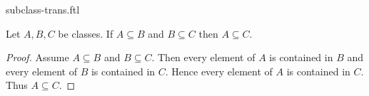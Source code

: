 \documentclass{stex}
\begin{document}
\begin{smodule}{subclass-trans.ftl}

  \begin{forthel}
    \begin{proposition}
      Let $A, B, C$ be classes.
      If $A \subseteq B$ and $B \subseteq C$ then $A \subseteq C$.
    \end{proposition}
    \begin{proof}
      Assume $A \subseteq B$ and $B \subseteq C$.
      Then every element of $A$ is contained in $B$ and every element of $B$ is contained in $C$.
      Hence every element of $A$ is contained in $C$.
      Thus $A \subseteq C$.
    \end{proof}
  \end{forthel}
\end{smodule}
\end{document}
